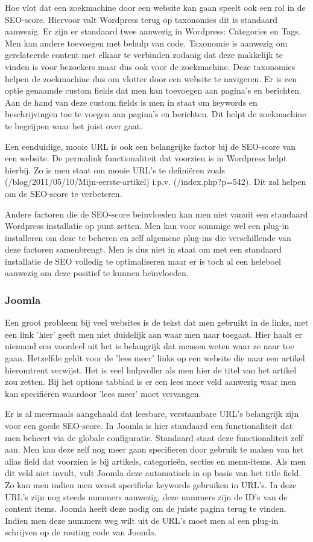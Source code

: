 Hoe vlot dat een zoekmachine door een website kan gaan speelt ook een rol in de SEO-score. Hiervoor valt Wordpress terug op taxonomies dit is standaard aanwezig. Er zijn er standaard twee aanwezig in Wordpress: Categories en Tags. Men kan andere toevoegen met behulp van code. Taxonomie is aanwezig om gerelateerde content met elkaar te verbinden zodanig dat deze makkelijk te vinden is voor bezoekers maar dus ook voor de zoekmachine. Deze taxonomies helpen de zoekmachine dus om vlotter door een website te navigeren. Er is een optie genaamde custom fields dat men kan toevoegen aan pagina's en berichten. Aan de hand van deze custom fields is men in staat om keywords en beschrijvingen toe te voegen aan pagina's en berichten. Dit helpt de zoekmachine te begrijpen waar het juist over gaat.

Een eenduidige, mooie URL is ook een belangrijke factor bij de SEO-score van een website. De permalink functionaliteit dat voorzien is in Wordpress helpt hierbij. Zo is men staat om mooie URL's te definiëren zoals (/blog/2011/05/10/Mijn-eerste-artikel) i.p.v. (/index.php?p=542). Dit zal helpen om de SEO-score te verbeteren.

Andere factoren die de SEO-score beinvloeden kan men niet vanuit een standaard Wordpress installatie op punt zetten. Men kan voor sommige wel een plug-in installeren om deze te beheren en zelf algemene plug-ins die verschillende van deze factoren samenbrengt. Men is dus niet in staat om met een standaard installatie de SEO volledig te optimaliseren maar er is toch al een heleboel aanwezig om deze positief te kunnen beïnvloeden.
\subsubsection{Joomla}
Een groot probleem bij veel websites is de tekst dat men gebruikt in de links, met een link 'hier' geeft men niet duidelijk aan waar men naar toegaat. Hier haalt er niemand een voordeel uit het is belangrijk dat mensen weten waar ze naar toe gaan. Hetzelfde geldt voor de 'lees meer' links op een website die naar een artikel hieromtrent verwijst. Het is veel hulpvoller als men hier de titel van het artikel zou zetten. Bij het options tabblad is er een lees meer veld aanwezig waar men kan specifiëren waardoor 'lees meer' moet vervangen.

Er is al meermaals aangehaald dat leesbare, verstaanbare URL's belangrijk zijn voor een goede SEO-score. In Joomla is hier standaard een functionaliteit dat men beheert via de globale configuratie. Standaard staat deze functionaliteit zelf aan. Men kan deze zelf nog meer gaan specifieren door gebruik te maken van het alias field dat voorzien is bij artikels, categorieën, secties en menu-items. Als men dit veld niet invult, vult Joomla deze automatisch in op basis van het title field. Zo kan men indien men wenst specifieke keywords gebruiken in URL's. In deze URL's zijn nog steeds nummers aanwezig, deze nummers zijn de ID's van de content items. Joomla heeft deze nodig om de juiste pagina terug te vinden. Indien men deze nummers weg wilt uit de URL's moet men al een plug-in schrijven op de routing code van Joomla. 

